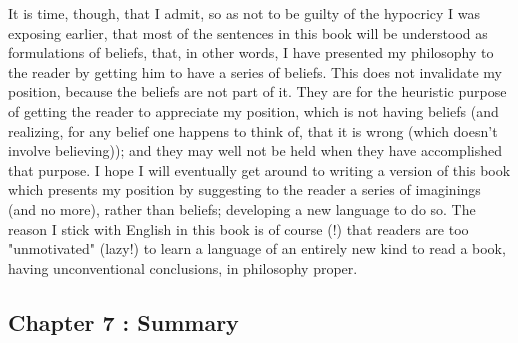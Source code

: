 \documentclass[10pt,twoside]{memoir}
\begin{document}
\begin{enumerate}
{It is time, though, that I admit, so as not to be guilty of the hypocricy I 
was exposing earlier, that most of the sentences in this book will be 
understood as formulations of beliefs, that, in other words, I have presented 
my philosophy to the reader by getting him to have a series of beliefs. This 
does not invalidate my position, because the beliefs are not part of it. They 
are for the heuristic purpose of getting the reader to appreciate my position, 
which is not having beliefs (and realizing, for any belief one happens to think 
of, that it is wrong (which doesn't involve believing)); and they may well not 
be held when they have accomplished that purpose. I hope I will eventually 
get around to writing a version of this book which presents my position by 
suggesting to the reader a series of imaginings (and no more), rather than 
beliefs; developing a new language to do so. The reason I stick with English 
in this book is of course (!) that readers are too "unmotivated" (lazy!) to 
learn a language of an entirely new kind to read a book, having 
unconventional conclusions, in philosophy proper. 

\subsection*{Chapter 7 : Summary}

}
\end{enumerate}
\end{document}
